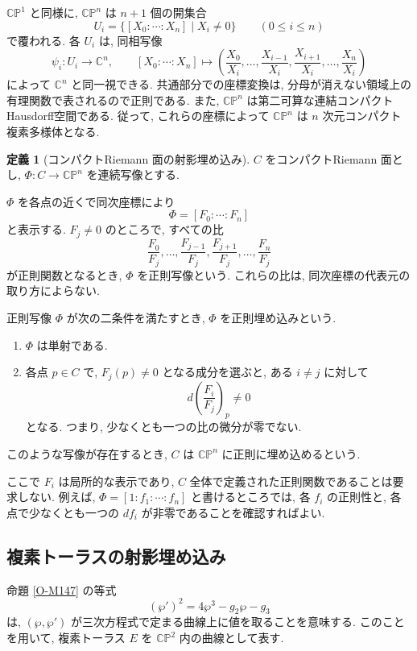 \documentclass[dvipdfmx,a4paper,11pt]{article} %
\newcommand{\C}{\mathbb{C}}
\theoremstyle{definition}
\numberwithin{equation}{section}
\newtheorem{dfn}[thm]{定義}
\begin{document}
$\C\mathbb P^1$ と同様に, $\C\mathbb P^n$ は $n+1$ 個の開集合
\[
U_i=\{[X_0:\cdots:X_n]\mid X_i\neq0\}
\qquad(0\leq i\leq n)
\]
で覆われる.
各 $U_i$ は, 同相写像
\[
\psi_i:U_i\longrightarrow\C^n,\qquad
[X_0:\cdots:X_n]\longmapsto
\left(
\frac{X_0}{X_i},\ldots,\frac{X_{i-1}}{X_i},
\frac{X_{i+1}}{X_i},\ldots,\frac{X_n}{X_i}
\right)
\]
によって $\C^n$ と同一視できる.
共通部分での座標変換は, 分母が消えない領域上の
有理関数で表されるので正則である.
また, $\C\mathbb P^n$ は第二可算な連結コンパクトHausdorff空間である.
従って, これらの座標によって
$\C\mathbb P^n$ は $n$ 次元コンパクト複素多様体となる.


\begin{dfn}[コンパクトRiemann 面の射影埋め込み]\label{O-M128}
$C$ をコンパクトRiemann 面とし,
$\Phi:C\to\C\mathbb P^n$ を連続写像とする.

$\Phi$ を各点の近くで同次座標により
\[
\Phi=[F_0:\cdots:F_n]
\]
と表示する.
$F_j\neq0$ のところで, すべての比
\[
\frac{F_0}{F_j},\ldots,\frac{F_{j-1}}{F_j},
\frac{F_{j+1}}{F_j},\ldots,\frac{F_n}{F_j}
\]
が正則関数となるとき, $\Phi$ を正則写像という.
これらの比は, 同次座標の代表元の取り方によらない.

正則写像 $\Phi$ が次の二条件を満たすとき,
$\Phi$ を正則埋め込みという.
\begin{enumerate}
\item
$\Phi$ は単射である.

\item
各点 $p\in C$ で, $F_j(p)\neq0$ となる成分を選ぶと,
ある $i\neq j$ に対して
\[
d\left(\frac{F_i}{F_j}\right)_p\neq0
\]
となる.
つまり, 少なくとも一つの比の微分が零でない.
\end{enumerate}
このような写像が存在するとき,
$C$ は $\C\mathbb P^n$ に正則に埋め込めるという.
\end{dfn}

ここで $F_i$ は局所的な表示であり,
$C$ 全体で定義された正則関数であることは要求しない.
例えば, $\Phi=[1:f_1:\cdots:f_n]$ と書けるところでは,
各 $f_i$ の正則性と,
各点で少なくとも一つの $df_i$ が非零であることを確認すればよい.


\subsection{複素トーラスの射影埋め込み}\label{O-S027-embedding}

命題 \ref{O-M147} の等式
\[
(\wp')^2=4\wp^3-g_2\wp-g_3
\]
は, $(\wp,\wp')$ が三次方程式で定まる曲線上に値を取ることを意味する.
このことを用いて, 複素トーラス $E$ を $\C\mathbb P^2$ 内の曲線として表す.
\end{document}
